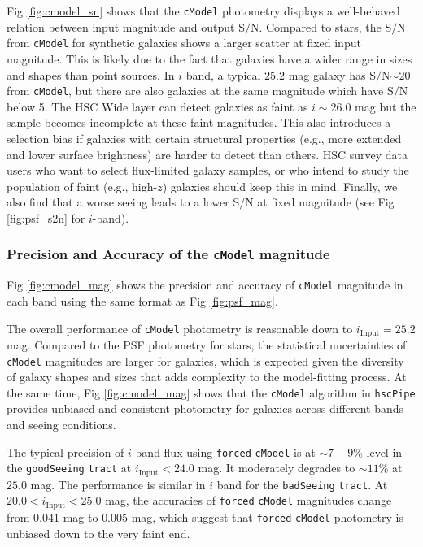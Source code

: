 \documentclass[useamsfonts]{pasj01}
\def\hscpipe{\texttt{hscPipe}}
\def\cmodel{\texttt{cModel}}
\def\forced{\texttt{forced}}
\def\tract{\texttt{tract}}
\def\s2n{{$\mathrm{S}/\mathrm{N}$}}
\newcommand{\plus}{\raisebox{.4\height}{\scalebox{.6}{+}}}
\newcommand{\minus}{\raisebox{.4\height}{\scalebox{.8}{-}}}
\begin{document}
    Fig \ref{fig:cmodel_sn} shows that the \cmodel{} photometry displays a 
    well-behaved relation between input magnitude and output \s2n{}.  
    Compared to stars, the \s2n{} from \cmodel{} for synthetic galaxies shows a larger
    scatter at fixed input magnitude. 
    This is likely due to the fact that galaxies have a wider range in sizes and shapes 
    than point sources.  
    In $i$ band, a typical $25.2$ mag galaxy has \s2n{}${\sim}20$ from \cmodel{}, but 
    there are also galaxies at the same magnitude which have \s2n{} below 5. 
    The HSC Wide layer can detect galaxies as faint as $i{\sim}26.0$ mag but the 
    sample becomes incomplete at these faint magnitudes.
    This also introduces a selection bias if galaxies with certain structural 
    properties (e.g., more extended and lower surface brightness) are harder to detect
    than others.
    HSC survey data users who want to select flux-limited galaxy samples,
    or who intend to study the population of faint (e.g., high-$z$) galaxies should
    keep this in mind.  
    Finally, we also find that a worse seeing leads to a lower \s2n{} at fixed 
    magnitude (see Fig \ref{fig:psf_s2n} for $i$-band).

\subsubsection{Precision and Accuracy of the \cmodel{} magnitude}

    Fig \ref{fig:cmodel_mag} shows the precision and accuracy of \cmodel{} magnitude 
    in each band using the same format as Fig \ref{fig:psf_mag}.

    The overall performance of \cmodel{} photometry is reasonable down to 
    $i_{\mathrm{Input}}=25.2$ mag.
    Compared to the PSF photometry for stars, the statistical uncertainties of \cmodel{} 
    magnitudes are larger for galaxies, which is expected given the diversity of galaxy 
    shapes and sizes that adds complexity to the model-fitting process.
    At the same time, Fig \ref{fig:cmodel_mag} shows that the \cmodel{} algorithm in
    \hscpipe{} provides unbiased and consistent photometry for galaxies across 
    different bands and seeing conditions.

    The typical precision of $i$-band flux using \forced{} \cmodel{} is at 
    ${\sim}7-9$\% level in the \texttt{goodSeeing} \tract{} at 
    $i_{\mathrm{Input}}<24.0$ mag. 
    It moderately degrades to ${\sim}11$\% at $25.0$ mag. 
    The performance is similar in $i$ band for the \texttt{badSeeing} \tract{}. 
    At $20.0 < i_{\mathrm{Input}} < 25.0$ mag, the accuracies of \forced{} \cmodel{}
    magnitudes change from \plus{}$0.041$ mag to \minus{}$0.005$ mag, which suggest
    that \forced{} \cmodel{} photometry is unbiased down to the very faint end.
    
\end{document}
